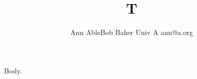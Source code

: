 \documentclass{article}
\begin{document}
\title{T}
\author{Ann Able\emails Bob Baker \affiliations Univ A \emails ann@a.org}
\maketitle
Body.
\end{document}

